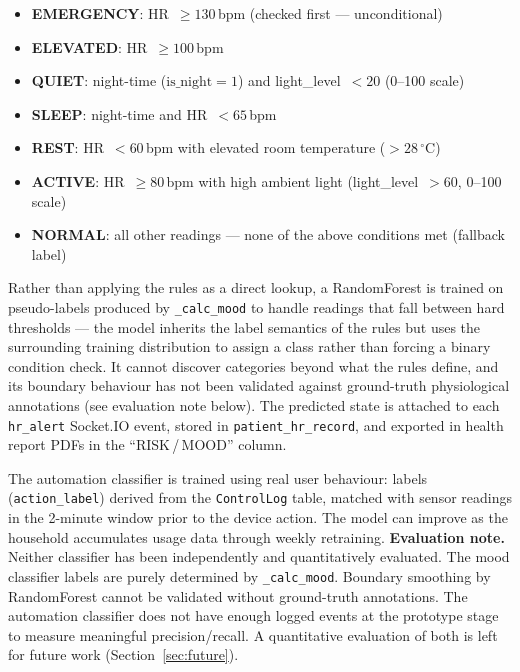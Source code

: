 \begin{itemize}
    \item \textbf{EMERGENCY}: HR~$\geq130$\,bpm (checked first — unconditional)
    \item \textbf{ELEVATED}: HR~$\geq100$\,bpm
    \item \textbf{QUIET}: night-time ($\text{is\_night}=1$) and light\_level~$<20$ (0--100 scale)
    \item \textbf{SLEEP}: night-time and HR~$<65$\,bpm
    \item \textbf{REST}: HR~$<60$\,bpm with elevated room temperature ($>28\,^\circ$C)
    \item \textbf{ACTIVE}: HR~$\geq80$\,bpm with high ambient light (light\_level~$>60$, 0--100 scale)
    \item \textbf{NORMAL}: all other readings — none of the above conditions met (fallback label)
\end{itemize}

Rather than applying the rules as a direct lookup, a RandomForest is trained on pseudo-labels produced by \texttt{\_calc\_mood} to handle readings that fall between hard thresholds --- the model inherits the label semantics of the rules but uses the surrounding training distribution to assign a class rather than forcing a binary condition check. It cannot discover categories beyond what the rules define, and its boundary behaviour has not been validated against ground-truth physiological annotations (see evaluation note below).
The predicted state is attached to each \texttt{hr\_alert} Socket.IO event, stored in \texttt{patient\_hr\_record}, and exported in health report PDFs in the ``RISK\,/\,MOOD'' column.

The automation classifier is trained using real user behaviour: labels (\texttt{action\_label}) derived from the \texttt{ControlLog} table, matched with sensor readings in the 2-minute window prior to the device action. 
The model can improve as the household accumulates usage data through weekly retraining. \textbf{Evaluation note.} Neither classifier has been independently and quantitatively evaluated. The mood classifier labels are purely determined by \texttt{\_calc\_mood}. Boundary smoothing by RandomForest cannot be validated without ground-truth annotations. The automation classifier does not have enough logged events at the prototype stage to measure meaningful precision/recall. A quantitative evaluation of both is left for future work (Section~\ref{sec:future}).

